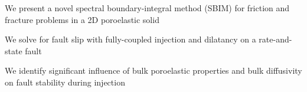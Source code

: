\documentclass[draft]{agujournal2019}
\begin{document}





\begin{keypoints}
\item We present a novel spectral boundary-integral method (SBIM) for friction and fracture problems in a 2D poroelastic solid
\item We solve for fault slip with fully-coupled injection and dilatancy on a rate-and-state fault
\item We identify significant influence of bulk poroelastic properties and bulk diffusivity on fault stability during injection
\end{keypoints}

%
%

%
%
\end{document}

